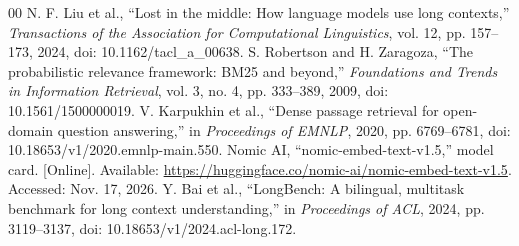 \documentclass[conference]{IEEEtran}
\begin{document}
\begin{thebibliography}{00}
 N. F. Liu et al., ``Lost in the middle: How language models use long contexts,'' \emph{Transactions of the Association for Computational Linguistics}, vol. 12, pp. 157--173, 2024, doi: 10.1162/tacl\_a\_00638.
 S. Robertson and H. Zaragoza, ``The probabilistic relevance framework: BM25 and beyond,'' \emph{Foundations and Trends in Information Retrieval}, vol. 3, no. 4, pp. 333--389, 2009, doi: 10.1561/1500000019.
 V. Karpukhin et al., ``Dense passage retrieval for open-domain question answering,'' in \emph{Proceedings of EMNLP}, 2020, pp. 6769--6781, doi: 10.18653/v1/2020.emnlp-main.550.
 Nomic AI, ``nomic-embed-text-v1.5,'' model card. [Online]. Available: \url{https://huggingface.co/nomic-ai/nomic-embed-text-v1.5}. Accessed: Nov. 17, 2026.
 Y. Bai et al., ``LongBench: A bilingual, multitask benchmark for long context understanding,'' in \emph{Proceedings of ACL}, 2024, pp. 3119--3137, doi: 10.18653/v1/2024.acl-long.172.
\end{thebibliography}
\end{document}
